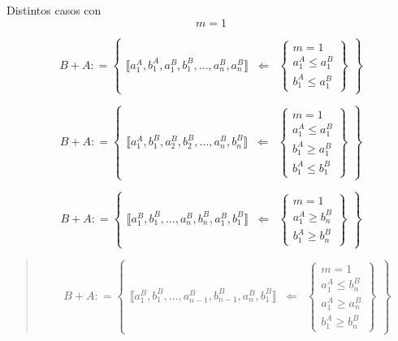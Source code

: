 \documentclass[
]{article}
\begin{document}
\begin{enumerate}
  Distintos casos con \[m = 1\]

  \[{{B + A}{: =}}\begin{Bmatrix}
  {⟦{{a_{1}^{A},b_{1}^{A}},{a_{1}^{B},b_{1}^{B}},\ldots,{a_{n}^{B},a_{n}^{B}}}⟧} & \Leftarrow & \begin{Bmatrix}
  {m = 1} \\
  {a_{1}^{A} \leq a_{1}^{B}} \\
  {b_{1}^{A} \leq a_{1}^{B}}
  \end{Bmatrix}
  \end{Bmatrix}\]

  \[{{B + A}{: =}}\begin{Bmatrix}
  {⟦{{a_{1}^{A},b_{1}^{B}},{a_{2}^{B},b_{2}^{B}},\ldots,{a_{n}^{B},b_{n}^{B}}}⟧} & \Leftarrow & \begin{Bmatrix}
  {m = 1} \\
  {a_{1}^{A} \leq a_{1}^{B}} \\
  {b_{1}^{A} \geq a_{1}^{B}} \\
  {b_{1}^{A} \leq b_{1}^{B}}
  \end{Bmatrix}
  \end{Bmatrix}\]
\end{enumerate}

\[{{B + A}{: =}}\begin{Bmatrix}
{⟦{{a_{1}^{B},b_{1}^{B}},\ldots,{a_{n}^{B},b_{n}^{B}},{a_{1}^{B},b_{1}^{B}}}⟧} & \Leftarrow & \begin{Bmatrix}
{m = 1} \\
{a_{1}^{A} \geq b_{n}^{B}} \\
{b_{1}^{A} \geq b_{n}^{B}}
\end{Bmatrix}
\end{Bmatrix}\]

\begin{quote}
\end{quote}

\begin{quote}
\[{{B + A}{: =}}\begin{Bmatrix}
{⟦{{a_{1}^{B},b_{1}^{B}},\ldots,{a_{n - 1}^{B},b_{n - 1}^{B}},{a_{n}^{B},b_{1}^{B}}}⟧} & \Leftarrow & \begin{Bmatrix}
{m = 1} \\
{a_{1}^{A} \leq b_{n}^{B}} \\
{a_{1}^{A} \geq a_{n}^{B}} \\
{b_{1}^{A} \geq b_{n}^{B}}
\end{Bmatrix}
\end{Bmatrix}\]
\end{quote}
\end{document}
